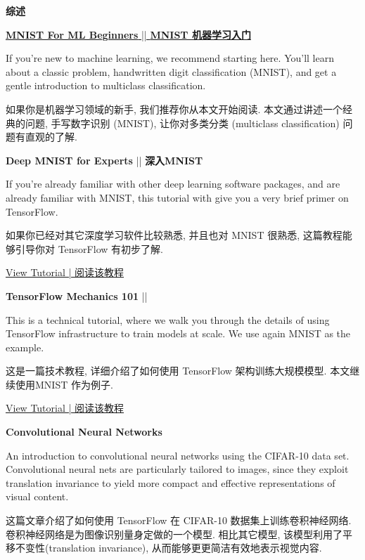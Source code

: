 



\textbf{综述}

\hyperref[MINIST_beginner]{\textcolor{etc}{\textbf{MNIST For ML Beginners}}  ||  \textbf{MNIST 机器学习入门}}

\textcolor{etc}{If you're new to machine learning, we recommend starting here. You'll learn about a classic problem, handwritten digit classification (MNIST), and get a gentle introduction to multiclass classification.}

如果你是机器学习领域的新手, 我们推荐你从本文开始阅读. 本文通过讲述一个经典的问题, 手写数字识别 (MNIST), 让你对多类分类 (multiclass classification) 问题有直观的了解.

\textcolor{etc}{\textbf{Deep MNIST for Experts}}  ||  \textbf{深入MNIST}

\textcolor{etc}{If you're already familiar with other deep learning software packages, and are already familiar with MNIST, this tutorial with give you a very brief primer on TensorFlow.}

如果你已经对其它深度学习软件比较熟悉, 并且也对 MNIST 很熟悉, 这篇教程能够引导你对 TensorFlow 有初步了解.

\hyperref[MINIST_pros]{View Tutorial | 阅读该教程}

\textcolor{etc}{\textbf{TensorFlow Mechanics 101}}  ||  \textbf{}

\textcolor{etc}{This is a technical tutorial, where we walk you through the details of using TensorFlow infrastructure to train models at scale. We use again MNIST as the example.}

这是一篇技术教程, 详细介绍了如何使用 TensorFlow 架构训练大规模模型. 本文继续使用MNIST 作为例子.

\hyperref[tf_mech101]{View Tutorial | 阅读该教程}

\textbf{Convolutional Neural Networks}

An introduction to convolutional neural networks using the CIFAR-10 data set. Convolutional neural nets are particularly tailored to images, since they exploit translation invariance to yield more compact and effective representations of visual content.

这篇文章介绍了如何使用 TensorFlow 在 CIFAR-10 数据集上训练卷积神经网络. 卷积神经网络是为图像识别量身定做的一个模型. 相比其它模型, 该模型利用了平移不变性(translation invariance), 从而能够更更简洁有效地表示视觉内容.

